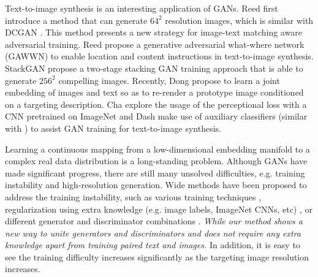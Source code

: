 \documentclass[10pt,twocolumn,letterpaper]{article}
\begin{document}
Text-to-image synthesis is an interesting application of GANs. Reed \etal \cite{reed2016generative}  first introduce a method that can generate $64^2$ resolution images, which is similar with DCGAN \cite{radford2015unsupervised}. This method presents a new strategy for image-text matching aware adversarial training. Reed \etal \cite{reed2016learning} propose a generative
adversarial what-where network (GAWWN) to enable location and content instructions in text-to-image synthesis. StackGAN \etal \cite{han2017stackgan} propose a two-stage stacking GAN training approach that is able to generate $256^2$ compelling images. Recently, Dong \etal \cite{dong2017semantic} propose to learn a joint embedding of images and text so as to re-render a prototype image conditioned on a targeting description. Cha \etal \cite{char2017perceptual} explore the usage of the perceptional loss \cite{johnson2016perceptual} with a CNN pretrained on ImageNet  and Dash \etal \cite{dash2017tac} make use of auxiliary classifiers (similar with \cite{odena2016conditional}) to assist GAN training for text-to-image synthesis. 
    
Learning a continuous mapping from a low-dimensional embedding manifold to a complex real data distribution is a long-standing problem. Although GANs have made significant progress, there are still many unsolved difficulties, e.g. training instability and high-resolution generation. Wide methods have been proposed to address the training instability, such as various training techniques \cite{salimans2016improved,arjovsky2017wasserstein,berthelot2017began,shrivastava2016learning,odena2016conditional}, regularization using extra knowledge (e.g. image labels, ImageNet CNNs, etc) \cite{dosovitskiy2016generating,ledig2016photo,dash2017tac,dash2017tac}, or different generator and discriminator combinations  \cite{metz2016unrolled,durugkar2016generative,yang2017lr,huang2016stacked}. \textit{While our method shows a new way to unite generators and discriminators and does not require any extra knowledge apart from training paired text and images.} In addition, it is easy to see the training difficulty increases significantly as the targeting image resolution increases.

\end{document}
